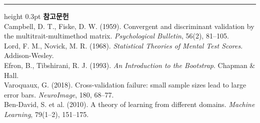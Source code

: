 \documentclass[10pt]{article}
\begin{document}
\vspace{0.6em}
\hrule height 0.3pt
\vspace{0.5em}
{\footnotesize
\textbf{참고문헌}\\[0.3em]
Campbell, D. T., Fiske, D. W. (1959). Convergent and discriminant validation by
the multitrait-multimethod matrix. \emph{Psychological Bulletin}, 56(2), 81--105.\\[0.15em]
Lord, F. M., Novick, M. R. (1968). \emph{Statistical Theories of Mental Test
Scores}. Addison-Wesley.\\[0.15em]
Efron, B., Tibshirani, R. J. (1993). \emph{An Introduction to the Bootstrap}.
Chapman \& Hall.\\[0.15em]
Varoquaux, G. (2018). Cross-validation failure: small sample sizes lead to large
error bars. \emph{NeuroImage}, 180, 68--77.\\[0.15em]
Ben-David, S. et al. (2010). A theory of learning from different domains.
\emph{Machine Learning}, 79(1--2), 151--175.
}
\end{document}
